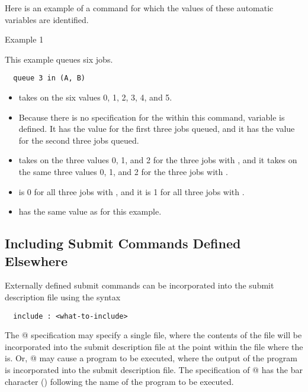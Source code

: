 Here is an example of a  command
for which the values of these automatic variables are identified.
\begin{description}
\item[Example 1]
\end{description}
This example queues six jobs.
\begin{verbatim}
  queue 3 in (A, B)
\end{verbatim}
\begin{itemize}
  \item {} takes on the six values 0, 1, 2, 3, 4, and 5.
  \item Because there is no specification for the 
within this  command, 
variable  is defined.
It has the value  for the first three jobs queued,
and it has the value  for the second three jobs queued.
  \item {} takes on the three values 0, 1, and 2
for the three jobs with ,
and it takes on the same three values 0, 1, and 2
for the three jobs with .
  \item {} is 0 for all three jobs with ,
and it is 1 for all three jobs with .
  \item {} has the same value as 
for this example.

\end{itemize}

\subsection{\label{sec:user-man-include}Including Submit Commands Defined Elsewhere}

Externally defined submit commands can be incorporated into 
the submit description file using the syntax
\begin{verbatim}
  include : <what-to-include>
\end{verbatim}

The @ specification may specify a single file,
where the contents of the file will be incorporated
into the submit description file at the point within the file
where the  is.
Or, @  may cause a program to be executed,
where the output of the program is incorporated
into the submit description file.
The specification of @ has the bar character
(\Expr{|}) following the name of the program to be executed.

